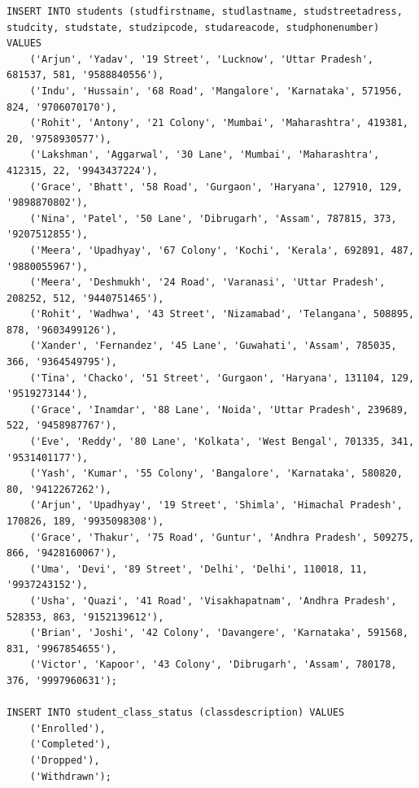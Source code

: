 \documentclass{article}
\begin{document}
\begin{Verbatim}[frame=single,framerule=1pt,fontfamily=courier,fontsize=\small]
INSERT INTO students (studfirstname, studlastname, studstreetadress, studcity, studstate, studzipcode, studareacode, studphonenumber) VALUES
    ('Arjun', 'Yadav', '19 Street', 'Lucknow', 'Uttar Pradesh', 681537, 581, '9588840556'),
    ('Indu', 'Hussain', '68 Road', 'Mangalore', 'Karnataka', 571956, 824, '9706070170'),
    ('Rohit', 'Antony', '21 Colony', 'Mumbai', 'Maharashtra', 419381, 20, '9758930577'),
    ('Lakshman', 'Aggarwal', '30 Lane', 'Mumbai', 'Maharashtra', 412315, 22, '9943437224'),
    ('Grace', 'Bhatt', '58 Road', 'Gurgaon', 'Haryana', 127910, 129, '9898870802'),
    ('Nina', 'Patel', '50 Lane', 'Dibrugarh', 'Assam', 787815, 373, '9207512855'),
    ('Meera', 'Upadhyay', '67 Colony', 'Kochi', 'Kerala', 692891, 487, '9880055967'),
    ('Meera', 'Deshmukh', '24 Road', 'Varanasi', 'Uttar Pradesh', 208252, 512, '9440751465'),
    ('Rohit', 'Wadhwa', '43 Street', 'Nizamabad', 'Telangana', 508895, 878, '9603499126'),
    ('Xander', 'Fernandez', '45 Lane', 'Guwahati', 'Assam', 785035, 366, '9364549795'),
    ('Tina', 'Chacko', '51 Street', 'Gurgaon', 'Haryana', 131104, 129, '9519273144'),
    ('Grace', 'Inamdar', '88 Lane', 'Noida', 'Uttar Pradesh', 239689, 522, '9458987767'),
    ('Eve', 'Reddy', '80 Lane', 'Kolkata', 'West Bengal', 701335, 341, '9531401177'),
    ('Yash', 'Kumar', '55 Colony', 'Bangalore', 'Karnataka', 580820, 80, '9412267262'),
    ('Arjun', 'Upadhyay', '19 Street', 'Shimla', 'Himachal Pradesh', 170826, 189, '9935098308'),
    ('Grace', 'Thakur', '75 Road', 'Guntur', 'Andhra Pradesh', 509275, 866, '9428160067'),
    ('Uma', 'Devi', '89 Street', 'Delhi', 'Delhi', 110018, 11, '9937243152'),
    ('Usha', 'Quazi', '41 Road', 'Visakhapatnam', 'Andhra Pradesh', 528353, 863, '9152139612'),
    ('Brian', 'Joshi', '42 Colony', 'Davangere', 'Karnataka', 591568, 831, '9967854655'),
    ('Victor', 'Kapoor', '43 Colony', 'Dibrugarh', 'Assam', 780178, 376, '9997960631');

INSERT INTO student_class_status (classdescription) VALUES
    ('Enrolled'),
    ('Completed'),
    ('Dropped'),
    ('Withdrawn');


\end{Verbatim}
\end{document}
